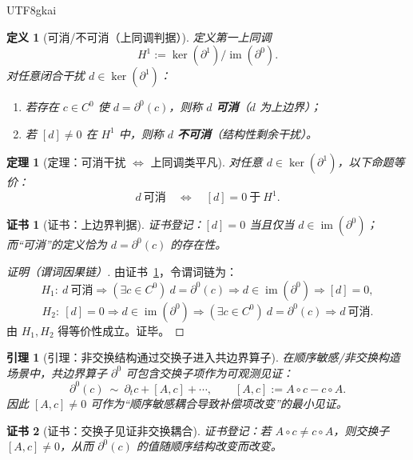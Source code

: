 \documentclass[12pt]{article}
\newtheorem{definition}{定义}[section]
\newtheorem{theorem}{定理}[section]
\newtheorem{lemma}{引理}[section]
\newtheorem{Certificate}{证书}[section]
\begin{document}
\begin{CJK*}{UTF8}{gkai}
\begin{definition}[可消/不可消（上同调判据）]
定义第一上同调
\[
  H^1 := \ker(\partial^1)\big/\operatorname{im}(\partial^0).
\]
对任意闭合干扰 $d\in\ker(\partial^1)$：
\begin{enumerate}
  \item 若存在 $c\in C^0$ 使 $d=\partial^0(c)$，则称 $d$ \textbf{可消}（$d$ 为上边界）；
  \item 若 $[d]\neq 0$ 在 $H^1$ 中，则称 $d$ \textbf{不可消}（结构性剩余干扰）。
\end{enumerate}
\end{definition}

\begin{theorem}[定理：可消干扰 $\Leftrightarrow$ 上同调类平凡]
\label{thm:cancellable-iff-coboundary}
对任意 $d\in\ker(\partial^1)$，以下命题等价：
\[
  d\ \text{可消}
  \quad\Longleftrightarrow\quad
  [d]=0\ \text{于}\ H^1.
\]
\end{theorem}

\begin{Certificate}[证书：上边界判据]
\label{cert:cancellable-iff-coboundary}
证书登记：$[d]=0$ 当且仅当 $d\in \operatorname{im}(\partial^0)$；
而“可消”的定义恰为 $d=\partial^0(c)$ 的存在性。
\end{Certificate}

\begin{proof}[证明（谓词因果链）]
由证书~\ref{cert:cancellable-iff-coboundary}，令谓词链为：
\[
  H_1:\ d\ \text{可消}\Rightarrow (\exists c\in C^0)\ d=\partial^0(c)\Rightarrow d\in\operatorname{im}(\partial^0)
    \Rightarrow [d]=0,
\]
\[
  H_2:\ [d]=0\Rightarrow d\in\operatorname{im}(\partial^0)\Rightarrow (\exists c\in C^0)\ d=\partial^0(c)\Rightarrow d\
    \text{可消}.
\]
由 $H_1,H_2$ 得等价性成立。证毕。
\end{proof}

\begin{lemma}[引理：非交换结构通过交换子进入共边界算子]
\label{lem:commutator-enters-coboundary}
在顺序敏感/非交换构造场景中，共边界算子 $\partial^0$ 可包含交换子项作为可观测见证：
\[
  \partial^0(c)\ \sim\ \partial_t c + [A,c] + \cdots,
  \qquad
  [A,c] := A\circ c - c\circ A.
\]
因此 $[A,c]\neq 0$ 可作为“顺序敏感耦合导致补偿项改变”的最小见证。
\end{lemma}

\begin{Certificate}[证书：交换子见证非交换耦合]
\label{cert:commutator-enters-coboundary}
证书登记：若 $A\circ c\neq c\circ A$，则交换子 $[A,c]\neq 0$，从而 $\partial^0(c)$ 的值随顺序结构改变而改变。
\end{Certificate}


\end{CJK*}
\end{document}
